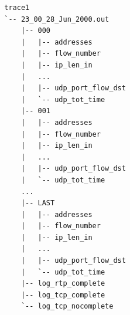 \documentclass[11pt]{article}
\begin{document}
\begin{small}\begin{verbatim}
        trace1
        `-- 23_00_28_Jun_2000.out
            |-- 000
            |   |-- addresses
            |   |-- flow_number
            |   |-- ip_len_in
            |   ...
            |   |-- udp_port_flow_dst
            |   `-- udp_tot_time
            |-- 001
            |   |-- addresses
            |   |-- flow_number
            |   |-- ip_len_in
            |   ...
            |   |-- udp_port_flow_dst
            |   `-- udp_tot_time
            ...
            |-- LAST
            |   |-- addresses
            |   |-- flow_number
            |   |-- ip_len_in
            |   ...
            |   |-- udp_port_flow_dst
            |   `-- udp_tot_time
            |-- log_rtp_complete
            |-- log_tcp_complete
            `-- log_tcp_nocomplete
\end{verbatim}\end{small} \noindent
\end{document}
